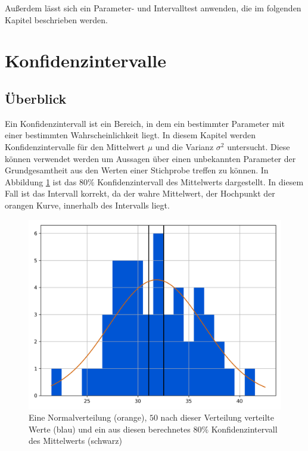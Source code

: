 \documentclass[10pt,twocolumn]{scrartcl}
\begin{document}
			Außerdem lässt sich ein Parameter- und Intervalltest anwenden, die im folgenden Kapitel beschrieben werden.

\section{Konfidenzintervalle}
	\subsection{Überblick}
	\label{chap_sim_results} %

	Ein Konfidenzintervall ist ein Bereich, in dem ein bestimmter Parameter mit einer bestimmten Wahrscheinlichkeit liegt. In diesem Kapitel werden Konfidenzintervalle für den Mittelwert $\mu$ und die Varianz $\sigma^2$ untersucht. Diese können verwendet werden um Aussagen über einen unbekannten Parameter der Grundgesamtheit aus den Werten einer Stichprobe treffen zu können. In Abbildung \ref{fig_mean_interval_hist} ist das $80\%$ Konfidenzintervall des Mittelwerts dargestellt. In diesem Fall ist das Intervall korrekt, da der wahre Mittelwert, der Hochpunkt der orangen Kurve, innerhalb des Intervalls liegt.
	\begin{figure}[h]%
		\centering
		\includegraphics[width=0.9\columnwidth]{images/histogram_50.png}
		\caption{Eine Normalverteilung (orange), $50$ nach dieser Verteilung verteilte Werte (blau) und ein aus diesen berechnetes $80\%$ Konfidenzintervall des Mittelwerts (schwarz)}
		\label{fig_mean_interval_hist}
	\end{figure}
\end{document}
